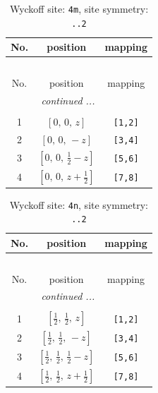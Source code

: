 \documentclass[fleqn,8pt]{jsarticle}
\begin{document}
\renewcommand{\arraystretch}{1.2}
\begin{longtable}{ccc}
\caption{Wyckoff site: {\tt 4m}, site symmetry: {\tt ..2}}
 \\
 \hline \hline
No. & position & mapping \\ \hline \endfirsthead

\multicolumn{2}{l}{\tablename\ \thetable{}} \\
 \hline \hline
No. & position & mapping \\ \hline \endhead

 \hline \hline
\multicolumn{2}{r}{\footnotesize\it continued ...} \\ \endfoot

 \hline \hline
\multicolumn{2}{r}{} \\ \endlastfoot

1 & $\left[ 0,\, 0,\, z \right]$ & {\tt [1,2]} \\ \hline
2 & $\left[ 0,\, 0,\, - z \right]$ & {\tt [3,4]} \\ \hline
3 & $\left[ 0,\, 0,\, \frac{1}{2} - z \right]$ & {\tt [5,6]} \\ \hline
4 & $\left[ 0,\, 0,\, z + \frac{1}{2} \right]$ & {\tt [7,8]} \\
\end{longtable}
\renewcommand{\arraystretch}{1.2}
\begin{longtable}{ccc}
\caption{Wyckoff site: {\tt 4n}, site symmetry: {\tt ..2}}
 \\
 \hline \hline
No. & position & mapping \\ \hline \endfirsthead

\multicolumn{2}{l}{\tablename\ \thetable{}} \\
 \hline \hline
No. & position & mapping \\ \hline \endhead

 \hline \hline
\multicolumn{2}{r}{\footnotesize\it continued ...} \\ \endfoot

 \hline \hline
\multicolumn{2}{r}{} \\ \endlastfoot

1 & $\left[ \frac{1}{2},\, \frac{1}{2},\, z \right]$ & {\tt [1,2]} \\ \hline
2 & $\left[ \frac{1}{2},\, \frac{1}{2},\, - z \right]$ & {\tt [3,4]} \\ \hline
3 & $\left[ \frac{1}{2},\, \frac{1}{2},\, \frac{1}{2} - z \right]$ & {\tt [5,6]} \\ \hline
4 & $\left[ \frac{1}{2},\, \frac{1}{2},\, z + \frac{1}{2} \right]$ & {\tt [7,8]} \\
\end{longtable}
\end{document}
